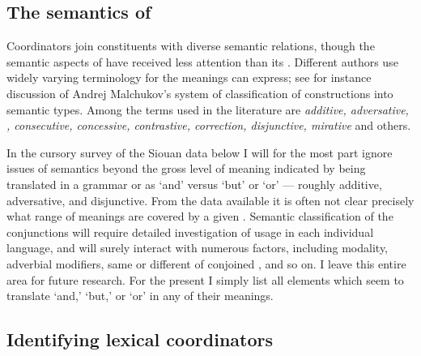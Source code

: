 \documentclass[output=paper]{LSP/langsci}
\begin{document}
\subsection{The semantics of }

Coordinators join constituents with diverse semantic relations, though the semantic aspects of  have received less attention than its . Different authors use widely varying terminology for the meanings  can express; see for instance  discussion of Andrej Malchukov's system of classification of  constructions into semantic types. Among the terms used in the literature are \textit{additive, adversative, , consecutive, concessive, contrastive, correction, disjunctive, mirative} and others.

In the cursory survey of the Siouan data below I will for the most part ignore issues of semantics beyond the gross level of meaning indicated by being translated in a grammar or  as `and' versus `but' or `or' --- roughly additive, adversative, and disjunctive. From the data available it is often not clear precisely what range of meanings are covered by a given . Semantic classification of the conjunctions will require detailed investigation of usage in each individual language, and will surely interact with numerous factors, including modality, adverbial modifiers, same or different  of conjoined , and so on. I leave this entire area for future research. For the present I simply list all elements which seem to translate `and,' `but,' or `or' in any of their meanings.

\subsection{Identifying lexical coordinators}
\end{document}
